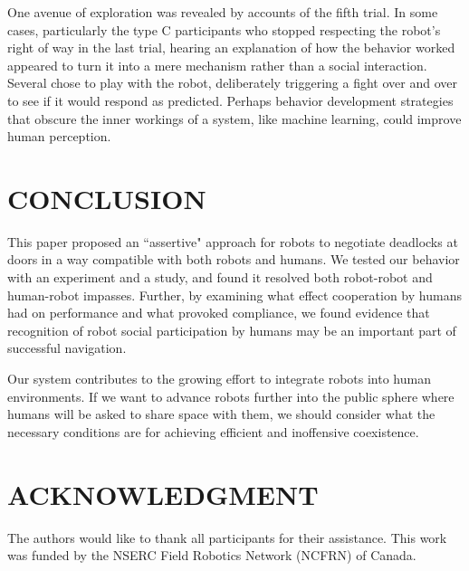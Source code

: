 \documentclass[letterpaper, 10 pt, conference]{ieeeconf}  %
\begin{document}
One avenue of exploration was revealed by accounts of the fifth trial. In some cases, particularly the type C participants who stopped respecting the robot's right of way in the last trial, hearing an explanation of how the behavior worked appeared to turn it into a mere mechanism rather than a social interaction. Several chose to play with the robot, deliberately triggering a fight over and over to see if it would respond as predicted. Perhaps behavior development strategies that obscure the inner workings of a system, like machine learning, could improve human perception.

\section{CONCLUSION}

This paper proposed an ``assertive" approach for robots to negotiate deadlocks at doors in a way compatible with both robots and humans. We tested our behavior with an experiment and a study, and found it resolved both robot-robot and human-robot impasses. Further, by examining what effect cooperation by humans had on performance and what provoked compliance, we found evidence that recognition of robot social participation by humans may be an important part of successful navigation.

Our system contributes to the growing effort to integrate robots into human environments. If we want to advance robots further into the public sphere where humans will be asked to share space with them, we should consider what the necessary conditions are for achieving efficient and inoffensive coexistence.

\section*{ACKNOWLEDGMENT}

The authors would like to thank all participants for their assistance. This work was funded by the NSERC Field Robotics Network (NCFRN) of Canada.
\end{document}
